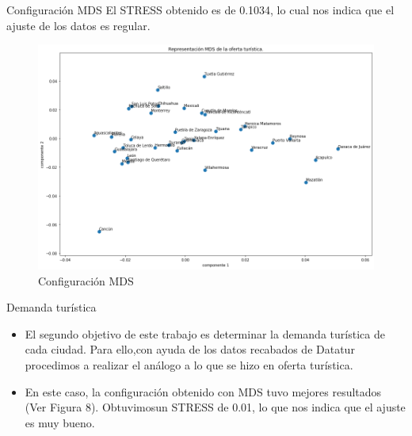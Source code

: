 \begin{frame}{Configuración MDS}
    El STRESS obtenido es de 0.1034, lo cual nos indica que el ajuste de los datos es regular. 
        \begin{figure}
        \centering
        \includegraphics[scale=0.28]{figure/oferta_turistica_c.png}
        \caption{Configuración MDS}
        \label{fig:oferta_turistica_c}
    \end{figure}
\end{frame}


\begin{frame}{Demanda turística}
    \begin{itemize}[<+- | alert@+>]
        \item El segundo objetivo de este trabajo es determinar la demanda turística de cada ciudad. Para ello,con ayuda de los datos recabados de Datatur procedimos a realizar el análogo a lo que se hizo en oferta turística.
        
        \item     En este caso, la configuración obtenido con MDS tuvo mejores resultados (Ver Figura 8). Obtuvimosun STRESS de 0.01, lo que nos indica que el ajuste es muy bueno. 
    \end{itemize}
\end{frame}

